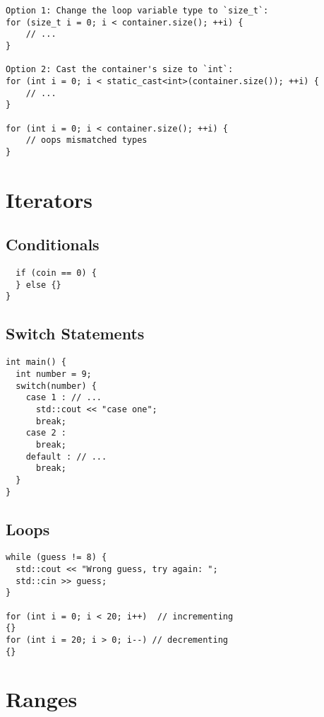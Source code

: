 \begin{verbatim}
Option 1: Change the loop variable type to `size_t`:
for (size_t i = 0; i < container.size(); ++i) {
    // ...
}

Option 2: Cast the container's size to `int`:
for (int i = 0; i < static_cast<int>(container.size()); ++i) {
    // ...
}

for (int i = 0; i < container.size(); ++i) {
    // oops mismatched types
}
\end{verbatim}

\section{Iterators}
\subsection{Conditionals}

\begin{verbatim}
  if (coin == 0) {
  }	else {}
}
\end{verbatim}

\subsection{Switch Statements}

\begin{verbatim}
int main() {
  int number = 9;
  switch(number) {
    case 1 : // ...
      std::cout << "case one";
      break;
    case 2 :
      break;
    default : // ...
      break;
  }
}
\end{verbatim}

\subsection{Loops}

\begin{verbatim}
while (guess != 8) {
  std::cout << "Wrong guess, try again: ";
  std::cin >> guess;
}

for (int i = 0; i < 20; i++)  // incrementing
{}
for (int i = 20; i > 0; i--) // decrementing
{}
\end{verbatim}

\section{Ranges}

